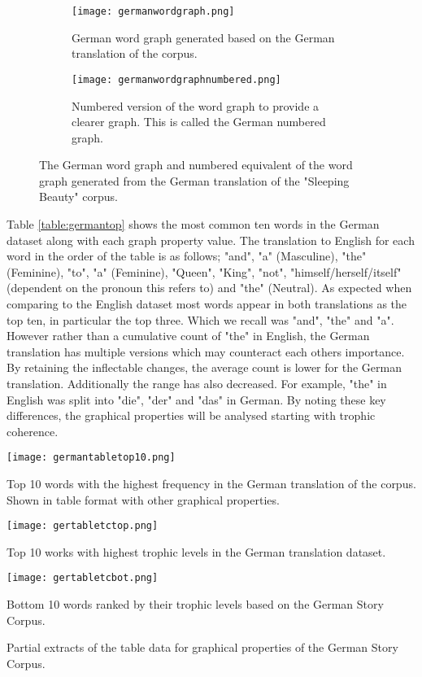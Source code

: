 \begin{figure}[H]
\centering
\begin{subfigure}{.45\textwidth}
	\texttt{[image: germanwordgraph.png]}
	\caption{German word graph generated based on the German translation of the corpus.}
	\label{fig:gerword}
\end{subfigure}
\hfill
\begin{subfigure}{.45\textwidth}
	\hspace{-2cm} 
	\texttt{[image: germanwordgraphnumbered.png]}
	\caption{Numbered version of the word graph to provide a clearer graph. This is called the German numbered graph.}
	\label{fig:gernum}
\end{subfigure}
\caption{The German word graph and numbered equivalent of the word graph generated from the German translation of the "Sleeping Beauty" corpus.}
\label{fig:gergraph}
\end{figure}

Table \ref{table:germantop} shows the most common ten words in the German dataset along with each graph property value. The translation to English for each word in the order of the table is as follows; "and", "a" (Masculine), "the" (Feminine), "to", "a" (Feminine), "Queen", "King", "not", "himself/herself/itself" (dependent on the pronoun this refers to) and "the" (Neutral). As expected when comparing to the English dataset most words appear in both translations as the top ten, in particular the top three. Which we recall was "and", "the" and "a". However rather than a cumulative count of "the" in English, the German translation has multiple versions which may counteract each others importance. By retaining the inflectable changes, the average count is lower for the German translation. Additionally the range has also decreased. For example, "the" in English was split into "die", "der" and "das" in German. By noting these key differences, the graphical properties will be analysed starting with trophic coherence.

\begin{table}[H]
\centering
\texttt{[image: germantabletop10.png]}
\caption{Top 10 words with the highest frequency in the German translation of the corpus. Shown in table format with other graphical properties. }
\label{table:germantop}
\end{table}

\begin{table}[H]
\centering
\begin{subtable}{.45\textwidth}
	\centering
	\texttt{[image: gertabletctop.png]}
	\caption{Top 10 works with highest trophic levels in the German translation dataset.}
	\label{table:germantoptc}
\end{subtable}
\hfill
\begin{subtable}{.45\textwidth}
	\centering
	\texttt{[image: gertabletcbot.png]}
	\caption{Bottom 10 words ranked by their trophic levels based on the German Story Corpus.}
	\label{table:germanbottc}
\end{subtable}
\caption{Partial extracts of the table data for graphical properties of the German Story Corpus.}
\end{table}

